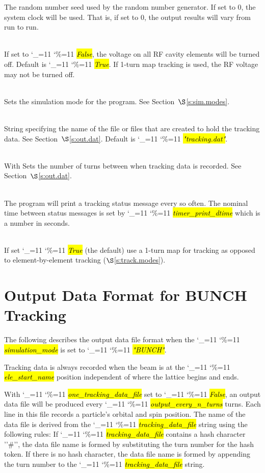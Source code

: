 \documentclass{hitec}
\newcommand\dottcmd[1]{\hl{\em#1}\endgroup}
\newcommand{\vn}{\begingroup\catcode`\_=11 \catcode`\%=11 \dottcmd}
\newcommand{\Newline}{\hfil \\}
\newcommand{\sref}[1]{$\S$\ref{#1}}
\newcommand{\Section}[1]{\section{#1}\vspace*{-1ex}}
\begin{document}
{{\begin{description}
The random number seed used by the random number generator. If set to 0, the
system clock will be used. That is, if set to 0, the output results will vary from run to run.
%
\item[rfcavity_on] \Newline
If set to \vn{False}, the voltage on all RF cavity elements will be turned off. Default is \vn{True}.
If 1-turn map tracking is used, the RF voltage may not be turned off.
%
\item[simulation_mode] \Newline
Sets the simulation mode for the program. See Section~\sref{s:sim.modes}.
%
\item[tracking_data_file] \Newline
String specifying the name of the file or files that are created to hold the tracking
data. See Section~\sref{s:out.dat}. Default is \vn{"tracking.dat"}.
%
\item[output_every_n_turns] \Newline
With Sets the number of turns between when tracking data is recorded. See Section~\sref{s:out.dat}.
%
\item[timer_print_dtime] \Newline
The program will print a tracking status message every so often. The nominal time between status
messages is set by \vn{timer_print_dtime} which is a number in seconds.
%
\item[use_1_turn_map] \Newline
If set \vn{True} (the default) use a 1-turn map for tracking as opposed to element-by-element
tracking (\sref{s:track.modes}).
\end{description}

\Section{Output Data Format for BUNCH Tracking}
\label{s:out.dat}

The following describes the output data file format when the \vn{simulation_mode} is set to
\vn{"BUNCH"}.

Tracking data is always recorded when the beam is at the \vn{ele_start_name} position independent of
where the lattice begins and ends.

With \vn{one_tracking_data_file} set to \vn{False}, an output data file will be produced every
\vn{output_every_n_turns} turns. Each line in this file records a particle's orbital and
spin position. The name of the data file is derived from the \vn{tracking_data_file} string using
the following rules: If \vn{tracking_data_file} contains a hash character ''\#'', the data file name
is formed by substituting the turn number for the hash token. If there is no hash character, the
data file name is formed by appending the turn number to the \vn{tracking_data_file} string.

}}
\end{document}
